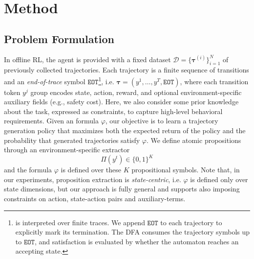 \section{Method}
\subsection{Problem Formulation}
In offline RL, the agent is provided with a fixed dataset $\mathcal{D}=\{\boldsymbol{\tau}^{(i)}\}_{i=1}^N$ of previously collected trajectories.
Each trajectory is a finite sequence of transitions and an \emph{end-of-trace} symbol $\texttt{EOT}$\footnote{\ltlf is interpreted over finite traces. We append $\texttt{EOT}$ to each trajectory to explicitly mark its termination. The DFA consumes the trajectory symbols up to $\texttt{EOT}$, and satisfaction is evaluated by whether the automaton reaches an accepting state.}, i.e. $\boldsymbol{\tau} = (y^1,\ldots,y^T,\texttt{EOT})$, where each transition token $y^j$ group encodes state, action, reward, and optional environment-specific auxiliary fields (e.g., safety cost). 
Here, we also consider some prior knowledge about the task, expressed as \ltlf constraints, to capture high-level behavioral requirements. Given an \ltlf formula $\varphi$, our objective is to learn a trajectory generation policy that maximizes both the expected return of the policy and the probability that generated trajectories satisfy $\varphi$.
%
We define atomic propositions through an environment-specific extractor 
\[
\Pi(y^t)\in\{0,1\}^K
\]
%
\noindent
and the \ltlf formula $\varphi$ is defined over these $K$ propositional symbols. Note that, in our experiments, proposition extraction is \textit{state-centric}, i.e. $\varphi$ is defined only over state dimensions, but our approach is fully general and supports also imposing constraints on action, state-action pairs and auxiliary-terms.

